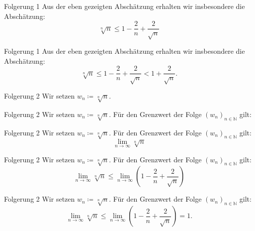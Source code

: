 \documentclass[10pt]{beamer}
\def\bN{\mathbb{N}}
\begin{document}
\begin{frame}{Folgerung 1}
    Aus der eben gezeigten Abschätzung erhalten wir insbesondere die Abschätzung:
    \[
        \sqrt[n]{n}
        \leq 1 - \frac{2}{n} + \frac{2}{\sqrt{n}}
    \]
\end{frame}



\begin{frame}{Folgerung 1}
    Aus der eben gezeigten Abschätzung erhalten wir insbesondere die Abschätzung:
    \[
        \sqrt[n]{n}
        \leq 1 - \frac{2}{n} + \frac{2}{\sqrt{n}}
        < 1 + \frac{2}{\sqrt{n}}.
    \]
\end{frame}



\begin{frame}{Folgerung 2}
    Wir setzen \( w_{n} \coloneq \sqrt[n]{n} \).
\end{frame}



\begin{frame}{Folgerung 2}
    Wir setzen \( w_{n} \coloneq \sqrt[n]{n} \). Für den Grenzwert der Folge \( \left( w_{n} \right)_{n \in \bN} \) gilt:
\end{frame}



\begin{frame}{Folgerung 2}
    Wir setzen \( w_{n} \coloneq \sqrt[n]{n} \). Für den Grenzwert der Folge \( \left( w_{n} \right)_{n \in \bN} \) gilt:
    \[
        \lim_{n \to \infty} \sqrt[n]{n}
    \]
\end{frame}



\begin{frame}{Folgerung 2}
    Wir setzen \( w_{n} \coloneq \sqrt[n]{n} \). Für den Grenzwert der Folge \( \left( w_{n} \right)_{n \in \bN} \) gilt:
    \[
        \lim_{n \to \infty} \sqrt[n]{n} 
        \leq \lim_{n \to \infty} \left( 1 - \frac{2}{n} + \frac{2}{\sqrt{n}} \right)
    \]
\end{frame}



\begin{frame}{Folgerung 2}
    Wir setzen \( w_{n} \coloneq \sqrt[n]{n} \). Für den Grenzwert der Folge \( \left( w_{n} \right)_{n \in \bN} \) gilt:
    \[
        \lim_{n \to \infty} \sqrt[n]{n} 
        \leq \lim_{n \to \infty} \left( 1 - \frac{2}{n} + \frac{2}{\sqrt{n}} \right)
        = 1.
    \]
\end{frame}
\end{document}
